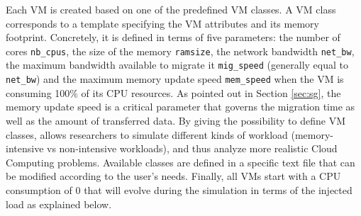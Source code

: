 Each VM is created based on one of the predefined VM classes. A VM
class corresponds to a template specifying the VM attributes and its
memory footprint. Concretely, it is
defined in terms of five parameters: the number of cores
\texttt{nb\_cpus}, the size of the memory \texttt{ramsize}, the
network bandwidth \texttt{net\_bw}, the maximum bandwidth available
to migrate it \texttt{mig\_speed} (generally equal to
\texttt{net\_bw}) and the maximum memory update speed
\texttt{mem\_speed} when the VM is consuming 100\% of its CPU
resources. As pointed out in Section \ref{sec:sg}, the memory update
speed is a critical parameter that governs the migration time as well
as the amount of transferred data. By giving the possibility to define
VM classes, \vmps allows researchers to simulate different kinds of
workload (\ie memory-intensive vs non-intensive workloads), and thus
analyze more realistic Cloud Computing problems.  Available classes
are defined in a specific text file that can be modified according to
the user's needs.
%
Finally, all VMs start with a CPU consumption of 0 that will evolve
during the simulation in terms of the injected load as explained
below.

